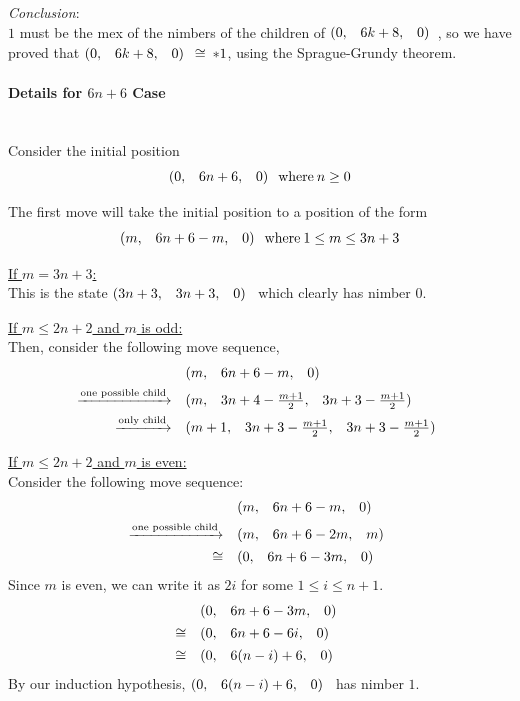 \documentclass{article}
\makeatletter
\newcommand{\game}[3]{\begin{array}{@{}*6r}(#1, & #2, & #3)\end{array}}
\newcommand{\gcong}{\cong\:}
\makeatother
\begin{document}
\bigskip
\textit{Conclusion}:\\
$1$ must be the mex of the nimbers of the children of $\game{0}{6k+8}{0}$,
so we have proved that $\game{0}{6k+8}{0} \gcong *1$, using the
Sprague-Grundy theorem.
\newpage

\paragraph{Details for $6n+6$ Case}\mbox{}\\
Consider the initial position
\begin{equation*}
  \game{0}{6n+6}{0} \: \text{where} \: n \geq 0
\end{equation*}

\medskip
The first move will take the initial position to a position of the form
\begin{equation*}
  \game{m}{6n+6-m}{0} \: \text{where} \: 1 \leq m \leq 3n+3
\end{equation*}

\bigskip
\underline{If $m = 3n+3$:} \\
This is the state $\game{3n+3}{3n+3}{0}$ which clearly has nimber $0$.

\bigskip
\underline{If $m \leq 2n + 2$ and $m$ is odd:} \\
Then, consider the following move sequence,
\begin{align*}
  & \game{m}{6n+6-m}{0} \\
  \xrightarrow{\text{one possible child}} \quad & 
  \game{m}{3n+4-\frac{m+1}{2}}{3n+3-\frac{m+1}{2}} \\
  \xrightarrow{\text{only child}} \quad & 
  \game{m+1}{3n+3-\frac{m+1}{2}}{3n+3-\frac{m+1}{2}} \\
\end{align*}

\bigskip
\underline{If $m \leq 2n + 2$ and $m$ is even:} \\
Consider the following move sequence:
\begin{align*}
  & \game{m}{6n+6-m}{0} \\
  \xrightarrow{\text{one possible child}} \quad & 
  \game{m}{6n+6-2m}{m} \\
  \cong \quad & 
  \game{0}{6n+6-3m}{0} \\
\end{align*}
Since $m$ is even, we can write it as $2i$ for some $1\leq i\leq n+1$.
\begin{align*}
  & \game{0}{6n+6-3m}{0} \\
  \cong \quad & \game{0}{6n+6-6i}{0} \\
  \cong \quad & \game{0}{6(n-i)+6}{0} \\
\end{align*}
By our induction hypothesis, $\game{0}{6(n-i)+6}{0}$ has nimber $1$.
\end{document}
